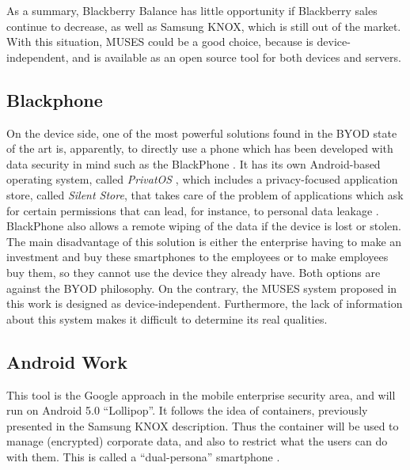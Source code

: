 As a summary, Blackberry Balance has little opportunity if Blackberry sales continue to decrease, as well as Samsung KNOX, which is still out of the market. With this situation, MUSES could be a good choice, because is device-independent, and is available as an open source tool for both devices and servers.


\subsection{Blackphone}
\label{subsec:blackphone}

On the device side, one of the most powerful solutions found in the BYOD state of the art is, apparently, to directly use a phone which has been developed with data security in mind such as the BlackPhone \cite{Blackphone}. It has its own Android-based operating system, called \textit{PrivatOS} \cite{Blackphone}, which includes a privacy-focused application store, called \textit{Silent Store}, that takes care of the problem of applications which ask for certain permissions that can lead, for instance, to personal data leakage \cite{gangula2013survey}. BlackPhone also allows a remote wiping of the data if the device is lost or stolen. The main disadvantage of this solution is either the enterprise having to make an investment and buy these smartphones to the employees or to make employees buy them, so they cannot use the device they already have. Both options are against the BYOD philosophy. On the contrary, the MUSES system proposed in this work is designed as device-independent.
Furthermore, the lack of information about this system makes it difficult to determine its real qualities.


\subsection{Android Work}
\label{subsec:androidwork}

This tool is the Google approach in the mobile enterprise security area, and  will run on Android 5.0 ``Lollipop''. It follows the idea of containers, previously presented in the Samsung KNOX description. Thus the container will be used to manage (encrypted) corporate data, and also to restrict what the users can do with them. This is called a ``dual-persona'' smartphone \cite{AndroidWork_review}.

